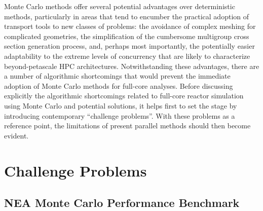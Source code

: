 Monte Carlo methods offer several potential advantages over deterministic
methods, particularly in areas that tend to encumber the practical adoption of
transport tools to new classes of problems: the avoidance of complex meshing for
complicated geometries, the simplification of the cumbersome multigroup cross
section generation process, and, perhaps most importantly, the potentially
easier adaptability to the extreme levels of concurrency that are likely to
characterize beyond-petascale HPC architectures. Notwithstanding these
advantages, there are a number of algorithmic shortcomings that would prevent
the immediate adoption of Monte Carlo methods for full-core analyses. Before
discussing explicitly the algorithmic shortcomings related to full-core reactor
simulation using Monte Carlo and potential solutions, it helps first to set the
stage by introducing contemporary ``challenge problems''. With these problems as
a reference point, the limitations of present parallel methods should then
become evident.

\section{Challenge Problems}

\subsection{NEA Monte Carlo Performance Benchmark}


